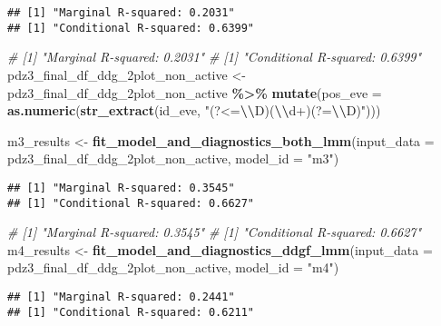 \documentclass[
]{article}
\newenvironment{Shaded}{\begin{snugshade}}{\end{snugshade}}
\newcommand{\AttributeTok}[1]{\textcolor[rgb]{0.13,0.29,0.53}{#1}}
\newcommand{\CommentTok}[1]{\textcolor[rgb]{0.56,0.35,0.01}{\textit{#1}}}
\newcommand{\FunctionTok}[1]{\textcolor[rgb]{0.13,0.29,0.53}{\textbf{#1}}}
\newcommand{\NormalTok}[1]{#1}
\newcommand{\OtherTok}[1]{\textcolor[rgb]{0.56,0.35,0.01}{#1}}
\newcommand{\SpecialCharTok}[1]{\textcolor[rgb]{0.81,0.36,0.00}{\textbf{#1}}}
\newcommand{\StringTok}[1]{\textcolor[rgb]{0.31,0.60,0.02}{#1}}
\begin{document}
\begin{verbatim}
## [1] "Marginal R-squared: 0.2031"
## [1] "Conditional R-squared: 0.6399"
\end{verbatim}

\begin{Shaded}
\begin{Highlighting}[]
\CommentTok{\# [1] "Marginal R{-}squared: 0.2031"}
\CommentTok{\# [1] "Conditional R{-}squared: 0.6399"}
\NormalTok{pdz3\_final\_df\_ddg\_2plot\_non\_active }\OtherTok{\textless{}{-}}\NormalTok{ pdz3\_final\_df\_ddg\_2plot\_non\_active }\SpecialCharTok{\%\textgreater{}\%}
  \FunctionTok{mutate}\NormalTok{(}\AttributeTok{pos\_eve =} \FunctionTok{as.numeric}\NormalTok{(}\FunctionTok{str\_extract}\NormalTok{(id\_eve, }\StringTok{"(?\textless{}=}\SpecialCharTok{\textbackslash{}\textbackslash{}}\StringTok{D)(}\SpecialCharTok{\textbackslash{}\textbackslash{}}\StringTok{d+)(?=}\SpecialCharTok{\textbackslash{}\textbackslash{}}\StringTok{D)"}\NormalTok{)))}

\NormalTok{m3\_results }\OtherTok{\textless{}{-}} \FunctionTok{fit\_model\_and\_diagnostics\_both\_lmm}\NormalTok{(}\AttributeTok{input\_data =}\NormalTok{ pdz3\_final\_df\_ddg\_2plot\_non\_active, }\AttributeTok{model\_id =} \StringTok{"m3"}\NormalTok{)}
\end{Highlighting}
\end{Shaded}

\begin{verbatim}
## [1] "Marginal R-squared: 0.3545"
## [1] "Conditional R-squared: 0.6627"
\end{verbatim}

\begin{Shaded}
\begin{Highlighting}[]
\CommentTok{\# [1] "Marginal R{-}squared: 0.3545"}
\CommentTok{\# [1] "Conditional R{-}squared: 0.6627"}
\NormalTok{m4\_results }\OtherTok{\textless{}{-}} \FunctionTok{fit\_model\_and\_diagnostics\_ddgf\_lmm}\NormalTok{(}\AttributeTok{input\_data =}\NormalTok{ pdz3\_final\_df\_ddg\_2plot\_non\_active, }\AttributeTok{model\_id =} \StringTok{"m4"}\NormalTok{)}
\end{Highlighting}
\end{Shaded}

\begin{verbatim}
## [1] "Marginal R-squared: 0.2441"
## [1] "Conditional R-squared: 0.6211"
\end{verbatim}
\end{document}
